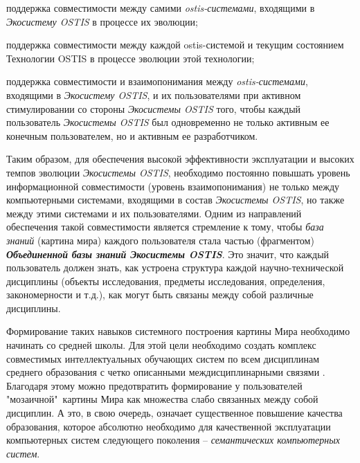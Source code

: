 \begin{SCn}
{\begin{scnitemize}
\item поддержка совместимости между самими \textit{ostis-системами}, входящими в \textit{Экосистему OSTIS} в процессе их эволюции;
\item поддержка совместимости между каждой ostis-системой и текущим состоянием Технологии OSTIS в процессе эволюции этой технологии;
\item поддержка совместимости и взаимопонимания между \textit{ostis-системами}, входящими в \textit{Экосистему OSTIS}, и их пользователями при активном стимулировании со стороны \textit{Экосистемы OSTIS} того, чтобы каждый пользователь \textit{Экосистемы OSTIS} был одновременно не только активным ее конечным пользователем, но и активным ее разработчиком.
\end{scnitemize}

Таким образом, для обеспечения высокой эффективности эксплуатации и высоких темпов эволюции  \textit{Экосистемы OSTIS}, необходимо постоянно повышать уровень информационной совместимости (уровень взаимопонимания) не только между компьютерными системами, входящими в состав \textit{Экосистемы OSTIS}, но также между этими системами и их пользователями. Одним из направлений обеспечения такой совместимости является стремление к тому, чтобы \textit{база знаний} (картина мира) каждого пользователя стала частью (фрагментом) \textbf{\textit{Объединенной базы знаний Экосистемы OSTIS}}.  Это значит, что каждый пользователь должен знать, как устроена структура каждой научно-технической дисциплины (объекты исследования, предметы исследования, определения, закономерности и т.д.), как могут быть связаны между собой различные дисциплины.

Формирование таких навыков системного построения картины Мира необходимо начинать со средней школы. Для этой цели необходимо создать комплекс совместимых интеллектуальных обучающих систем по всем дисциплинам среднего образования с четко описанными междисциплинарными связями \cite{Bashmakov, Taranchuk2015}. Благодаря этому можно предотвратить формирование у пользователей "мозаичной"\ картины Мира как множества слабо связанных между собой дисциплин. А это, в свою очередь, означает существенное повышение качества образования, которое абсолютно необходимо для качественной эксплуатации компьютерных систем следующего поколения --  \textit{семантических компьютерных систем}.

}
\end{SCn}

